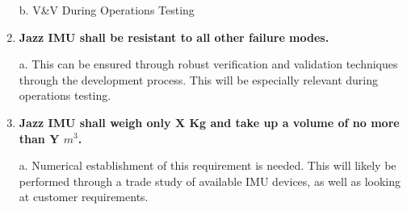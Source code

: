 \documentclass[14pt,a4paper]{article}
\begin{document}
\begin{CenturySchool}
\begin{enumerate}
					
					\subitem b.	V\&V During Operations Testing
					
					\item{\bfseries Jazz IMU shall be resistant to all other failure modes.}
					
					\subitem a.	This can be ensured through robust verification and validation techniques through the development process. This will be especially relevant during operations testing.
					
					\item{\bfseries Jazz IMU shall weigh only X Kg and take up a volume of no more than Y \(m^3\).}
					
					\subitem a.	Numerical establishment of this requirement is needed. This will likely be performed through a trade study of available IMU devices, as well as looking at customer requirements.
					
				\end{enumerate}	

	\end{CenturySchool}
\end{document}
